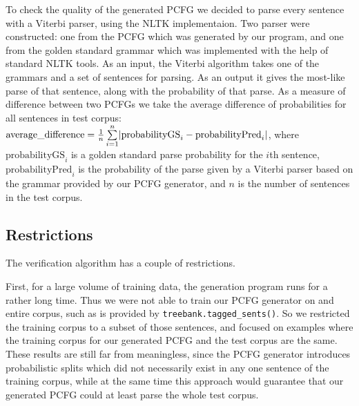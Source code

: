\documentclass[paper=a4, fontsize=11pt]{scrartcl} %
\numberwithin{equation}{section} %
\numberwithin{figure}{section} %
\numberwithin{table}{section} %
\begin{document}
To check the quality of the generated PCFG we decided to parse every sentence with a Viterbi parser, using the NLTK implementaion. Two parser were constructed: one from the PCFG which was generated by our program, and one from the golden standard grammar which was implemented with the help of standard NLTK tools. As an input, the Viterbi algorithm takes one of the grammars and a set of sentences for parsing. As an output it gives the most-like parse of that sentence, along with the probability of that parse. As a measure of difference between two PCFGs we take the average difference of probabilities for all sentences in test corpus: \begin{math} \text{average\_difference} = {1 \over n} \sum \limits_{i=1}^n \lvert \text{probabilityGS}_i - \text{probabilityPred}_i \rvert \end{math}, where \begin{math} \text{probabilityGS}_i \end{math} is a golden standard parse probability for the $i$th sentence, \begin{math} \text{probabilityPred}_i \end{math} is the probability of the parse given by a Viterbi parser based on the grammar provided by our PCFG generator, and $n$ is the number of sentences in the test corpus.

\subsection{Restrictions}
The verification algorithm has a couple of restrictions. 

First, for a large volume of training data, the generation program runs for a rather long time. Thus we were not able to train our PCFG generator on and entire corpus, such as is provided by \texttt{treebank.tagged\_sents()}. So we restricted the training corpus to a subset of those sentences, and focused on examples where the training corpus for our generated PCFG and the test corpus are the same. These results are still far from meaningless, since the PCFG generator introduces probabilistic splits which did not necessarily exist in any one sentence of the training corpus, while at the same time this approach would guarantee that our generated PCFG could at least parse the whole test corpus. 
\end{document}
